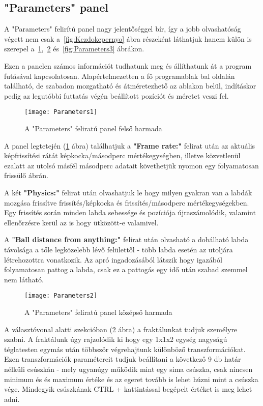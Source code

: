 \subsection{"Parameters" panel}

A "Parameters" felirítú panel nagy jelentőséggel bír, így a jobb olvashatóság végett nem csak a~\ref{fig:Kezdokepernyo} ábra részeként láthatjuk hanem külön is szerepel a~\ref{fig:Parameters1},~\ref{fig:Parameters2} és~\ref{fig:Parameters3} ábrákon.

Ezen a panelen számos információt tudhatunk meg és állíthatunk át a program futásával kapcsolatosan. Alapértelmezetten a fő programablak bal oldalán található, de szabadon mozgatható és átméretezhető az ablakon belül, indításkor pedig az legutóbbi futtatás végén beállított pozíciót és méretet veszi fel. 

\begin{figure}[H]
	\centering
	\texttt{[image: Parameters1]}
	\caption{A "Parameters" feliratú panel felső harmada}
	\label{fig:Parameters1}
\end{figure}

A panel legtetején (\ref{fig:Parameters1} ábra) találhatjuk a \textbf{"Frame rate:"} felirat után az aktuális képfrissítési rátát képkocka/másodperc mértékegységben, illetve közvetlenül ezalatt az utolsó másfél másodperc adatait követhetjük nyomon egy folyamatosan frissülő ábrán. 

A két \textbf{"Physics:"} felirat után olvashatjuk le hogy milyen gyakran van a labdák mozgása frissítve frissítés/képkocka és frissítés/másodperc mértékegységekben. Egy frissítés során minden labda sebessége és pozíciója újraszámolódik, valamint ellenőrzésre kerül az is hogy ütközött-e valamivel. 

A \textbf{"Ball distance from anything:"} felirat után olvasható a dobálható labda távolsága a tőle legközelebb lévő felülettől - több labda esetén az utoljára létrehozottra vonatkozik. Az apró ingadozásából látszik hogy igazából folyamatosan pattog a labda, csak ez a pattogás egy idő után szabad szemmel nem látható.

\begin{figure}[H]
	\centering
	\texttt{[image: Parameters2]}
	\caption{A "Parameters" feliratú panel középső harmada}
	\label{fig:Parameters2}
\end{figure}

A választóvonal alatti szekcióban (\ref{fig:Parameters2} ábra) a fraktálunkat tudjuk személyre szabni. A fraktálunk úgy rajzolódik ki hogy egy 1x1x2 egység nagyságú téglatesten egymás után többször végrehajtunk különböző transzformációkat. Ezen transzformációk paramétereit tudjuk beállítani a következő 9 db határ nélküli csúszkán - mely ugyanúgy működik mint egy sima csúszka, csak nincsen minimum és és maximum értéke és az egeret tovább is lehet húzni mint a csúszka vége. Mindegyik csúszkának CTRL + kattintással begépelt értéket is meg lehet adni. 

